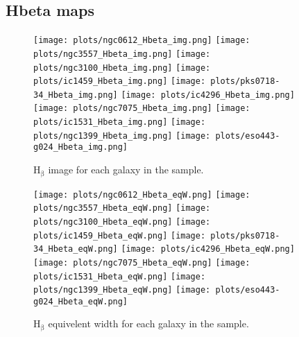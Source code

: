 \documentclass[fleqn,usenatbib,useAMS]{mnras}
\begin{document}
    \subsection{Hbeta maps}
        \label{subsec:Hbetamaps}
        \begin{figure*}
            \centering
            \texttt{[image: plots/ngc0612\_Hbeta\_img.png]}
            \texttt{[image: plots/ngc3557\_Hbeta\_img.png]}
            \texttt{[image: plots/ngc3100\_Hbeta\_img.png]}
            \texttt{[image: plots/ic1459\_Hbeta\_img.png]}
            \texttt{[image: plots/pks0718-34\_Hbeta\_img.png]}
            \texttt{[image: plots/ic4296\_Hbeta\_img.png]}
            \texttt{[image: plots/ngc7075\_Hbeta\_img.png]}
            \texttt{[image: plots/ic1531\_Hbeta\_img.png]}
            \texttt{[image: plots/ngc1399\_Hbeta\_img.png]}
            \texttt{[image: plots/eso443-g024\_Hbeta\_img.png]}
            \caption{H$_\mathrm{\beta}$ image for each galaxy in the sample.}
            \label{fig:Hbeta_img}
        \end{figure*}


        \begin{figure*}
            \centering
            \texttt{[image: plots/ngc0612\_Hbeta\_eqW.png]}
            \texttt{[image: plots/ngc3557\_Hbeta\_eqW.png]}
            \texttt{[image: plots/ngc3100\_Hbeta\_eqW.png]}
            \texttt{[image: plots/ic1459\_Hbeta\_eqW.png]}
            \texttt{[image: plots/pks0718-34\_Hbeta\_eqW.png]}
            \texttt{[image: plots/ic4296\_Hbeta\_eqW.png]}
            \texttt{[image: plots/ngc7075\_Hbeta\_eqW.png]}
            \texttt{[image: plots/ic1531\_Hbeta\_eqW.png]}
            \texttt{[image: plots/ngc1399\_Hbeta\_eqW.png]}
            \texttt{[image: plots/eso443-g024\_Hbeta\_eqW.png]}
            \caption{H$_\mathrm{\beta}$ equivelent width for each galaxy in the sample.}
            \label{fig:Hbeta_eqW}
        \end{figure*}
\end{document}
